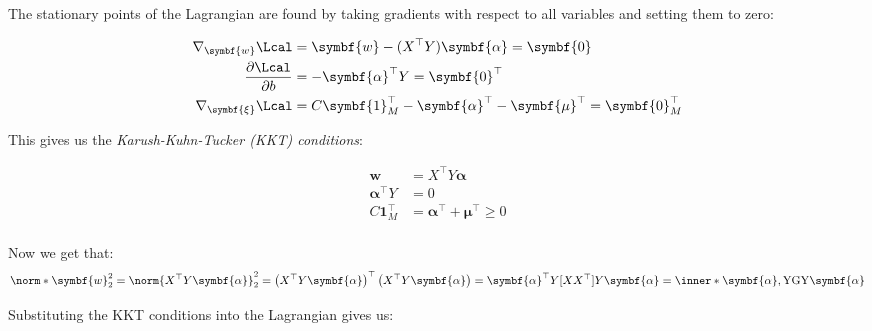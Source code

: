 {The stationary points of the Lagrangian are found by taking gradients with respect to all variables and setting them to zero:

\begin{align*}
  \nabla_{\symbf{w}} \Lcal          & = \symbf{w} -  (X^\top Y) \symbf{\alpha} = \symbf{0}                             \\
  \frac{\partial \Lcal}{\partial b} & = - \symbf{\alpha}^\top Y = \symbf{0}^\top                                       \\
  \nabla_{\symbf{\xi}} \Lcal        & = C \symbf{1}_M^\top - \symbf{\alpha}^\top - \symbf{\mu}^\top = \symbf{0}_M^\top
\end{align*}

This gives us the \emph{Karush-Kuhn-Tucker (KKT) conditions}:

\begin{align*}
  \symbf{w}             & = X^\top Y \symbf{\alpha}                        \\
  \symbf{\alpha}^\top Y & = 0                                              \\
  C \symbf{1}_M^\top    & = \symbf{\alpha}^\top + \symbf{\mu}^\top  \geq 0 \\
\end{align*}

Now we get that:
\[
  \norm*{\symbf{w}}_2^2 = \norm{X^\top Y \symbf{\alpha}}_2^2 = \left(X^\top Y \symbf{\alpha}\right)^\top \left(X^\top Y \symbf{\alpha}\right) = \symbf{\alpha}^\top Y [X X^\top] Y \symbf{\alpha} = \inner*{\symbf{\alpha}, \mathrm{Y} \mathrm{G} \mathrm{Y} \symbf{\alpha}}
\]

Substituting the KKT conditions into the Lagrangian gives us:

}
